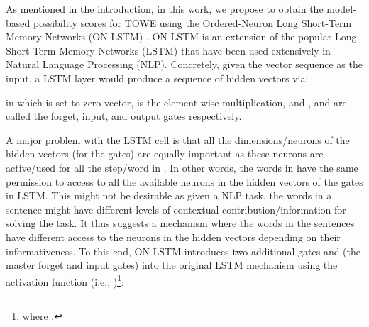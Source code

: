 \documentclass[11pt,a4paper]{article}
\begin{document}
As mentioned in the introduction, in this work, we propose to obtain the model-based possibility scores for TOWE using the Ordered-Neuron Long Short-Term Memory Networks (ON-LSTM) \cite{Shen2019ordered}. ON-LSTM is an extension of the popular Long Short-Term Memory Networks (LSTM) that have been used extensively in Natural Language Processing (NLP). Concretely, given the vector sequence  as the input, a LSTM layer would produce a sequence of hidden vectors  via:

in which  is set to zero vector,  is the element-wise multiplication, and ,  and  are called the forget, input, and output gates respectively.















A major problem with the LSTM cell is that all the dimensions/neurons of the hidden vectors (for the gates) are equally important as these neurons are active/used for all the step/word  in . In other words, the words in  have the same permission to access to all the available neurons in the hidden vectors of the gates in LSTM. This might not be desirable as given a NLP task, the words in a sentence might have different levels of contextual contribution/information for solving the task. It thus suggests a mechanism where the words in the sentences have different access to the neurons in the hidden vectors depending on their informativeness. To this end, ON-LSTM introduces two additional gates  and  (the master forget and input gates) into the original LSTM mechanism using the  activation function (i.e., )\footnote{ where .}:
\end{document}
